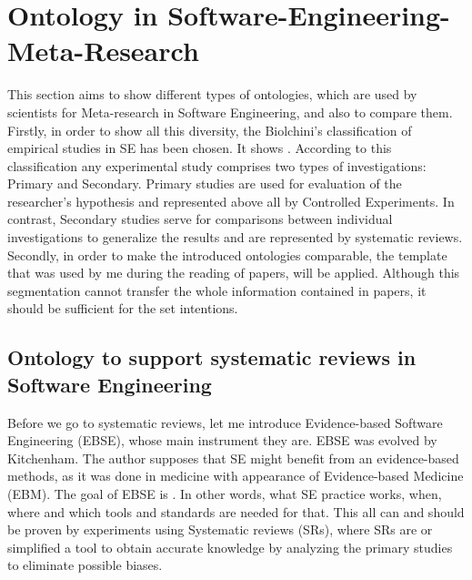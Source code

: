 		

\section{Ontology in Software-Engineering-Meta-Research}
This section aims to show different types of ontologies, which are used by scientists for Meta-research in Software Engineering, and also to compare them.  \newline
 Firstly, in order to show all this diversity, the Biolchini's\cite{Bio07} classification of empirical studies in SE has been chosen. It shows \frqq\cite[p. 1]{Gar08}. According to this classification any experimental study comprises two types of investigations: Primary and Secondary\cite[p. 134]{Bio07}. Primary studies are used for evaluation of the researcher's hypothesis and represented above all by Controlled Experiments. In contrast, Secondary studies serve for comparisons between individual investigations to generalize the results and are represented by systematic reviews. \newline
 Secondly, in order to make the introduced ontologies comparable, the template  \frqq that was used by me during the reading of papers, will be applied. Although this segmentation cannot transfer the whole information contained in papers, it should be sufficient for the set intentions.
    
 
	\subsection{Ontology to support systematic reviews in Software Engineering}  
	Before we go to systematic reviews, let me introduce Evidence-based Software Engineering (EBSE), whose main instrument they are. EBSE was evolved by Kitchenham\cite{Kit04}. The author supposes that SE might benefit from an evidence-based methods, as it was done in medicine with appearance of Evidence-based Medicine (EBM). The goal of EBSE is \frqq \cite[p. 2]{Kit04}. In other words, what SE practice works,  when, where and which tools and standards are needed for that. This all can and should be proven by experiments using Systematic reviews (SRs), where SRs are \frqq \cite{Kit07} or simplified a tool to obtain accurate knowledge by analyzing the primary studies to eliminate possible biases. \newline
	
